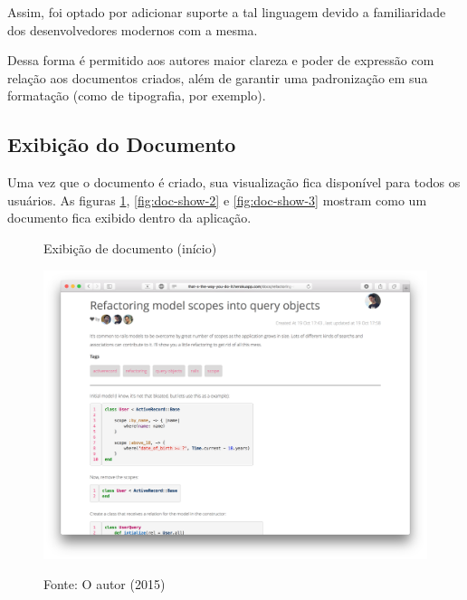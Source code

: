 Assim, foi optado por adicionar suporte a tal linguagem devido a familiaridade dos desenvolvedores modernos com a mesma.

Dessa forma é permitido aos autores maior clareza e poder de expressão com relação aos documentos criados, além de garantir uma padronização em sua formatação (como de tipografia, por exemplo).

\subsection{Exibição do Documento}

Uma vez que o documento é criado, sua visualização fica disponível para todos os usuários. As figuras \ref{fig:doc-show-1}, \ref{fig:doc-show-2} e \ref{fig:doc-show-3} mostram como um documento fica exibido dentro da aplicação.

\begin{figure}[h]
	\centering
    \caption{Exibição de documento (início)}
    \includegraphics[width=15cm]{Imagens/print-show-1.png}
    \label{fig:doc-show-1}
	\caption*{Fonte: O autor (2015)}
\end{figure}


